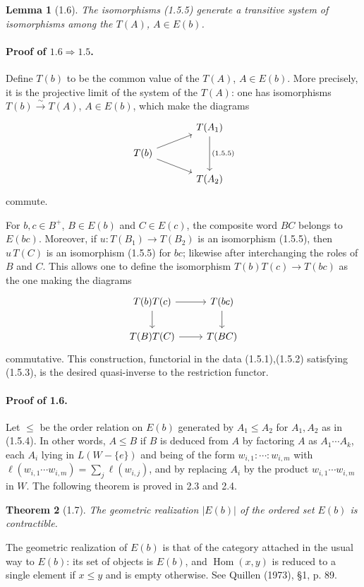 \documentclass[11pt]{article}
\newcommand{\Hom}{\operatorname{Hom}}
\newtheorem{theorem}{Theorem}[section]
\newtheorem{lemma}[theorem]{Lemma}
\begin{document}
\begin{lemma}[1.6]
The isomorphisms (1.5.5) generate a transitive system of isomorphisms among the $T(A)$, $A\in E(b)$.
\end{lemma}

\paragraph{Proof of $1.6\Rightarrow1.5$.} Define $T(b)$ to be the common value of the $T(A)$, $A\in E(b)$. More precisely, it is the projective limit of the system of the $T(A)$: one has isomorphisms $T(b)\xrightarrow{\sim}T(A)$, $A\in E(b)$, which make the diagrams
\[
\begin{tikzcd}[row sep=small,column sep=large]
& T(A_1) \arrow[dd,"(1.5.5)"]\\
T(b) \arrow[ur] \arrow[dr] & \\
& T(A_2)
\end{tikzcd}
\]
commute.

For $b,c\in B^+$, $B\in E(b)$ and $C\in E(c)$, the composite word $BC$ belongs to $E(bc)$. Moreover, if $u:T(B_1)\to T(B_2)$ is an isomorphism (1.5.5), then $u\,T(C)$ is an isomorphism (1.5.5) for $bc$; likewise after interchanging the roles of $B$ and $C$. This allows one to define the isomorphism $T(b)T(c)\to T(bc)$ as the one making the diagrams
\[
\begin{tikzcd}
T(b)T(c) \arrow[r] \arrow[d] & T(bc) \arrow[d]\\
T(B)T(C) \arrow[r] & T(BC)
\end{tikzcd}
\]
commutative. This construction, functorial in the data (1.5.1),(1.5.2) satisfying (1.5.3), is the desired quasi-inverse to the restriction functor.

\paragraph{Proof of 1.6.} Let $\leq$ be the order relation on $E(b)$ generated by $A_1\leq A_2$ for $A_1,A_2$ as in (1.5.4). In other words, $A\leq B$ if $B$ is deduced from $A$ by factoring $A$ as $A_1\cdots A_k$, each $A_i$ lying in $L(W-\{e\})$ and being of the form $w_{i,1}:\cdots:w_{i,m}$ with $\ell(w_{i,1}\cdots w_{i,m})=\sum_j\ell(w_{i,j})$, and by replacing $A_i$ by the product $w_{i,1}\cdots w_{i,m}$ in $W$. The following theorem is proved in 2.3 and 2.4.

\begin{theorem}[1.7]
The geometric realization $|E(b)|$ of the ordered set $E(b)$ is contractible.
\end{theorem}
The geometric realization of $E(b)$ is that of the category attached in the usual way to $E(b)$: its set of objects is $E(b)$, and $\Hom(x,y)$ is reduced to a single element if $x\leq y$ and is empty otherwise. See Quillen (1973), \S1, p. 89.
\end{document}
